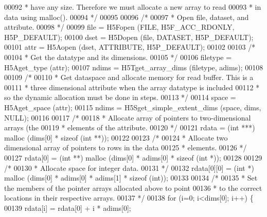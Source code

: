 \begin{DoxyCode}
00092 \textcolor{comment}{     * have any size.  Therefore we must allocate a new array to read}
00093 \textcolor{comment}{     * in data using malloc().}
00094 \textcolor{comment}{     */}
00095 
00096     \textcolor{comment}{/*}
00097 \textcolor{comment}{     * Open file, dataset, and attribute.}
00098 \textcolor{comment}{     */}
00099     file = H5Fopen (FILE, H5F\_ACC\_RDONLY, H5P\_DEFAULT);
00100     dset = H5Dopen (file, DATASET, H5P\_DEFAULT);
00101     attr = H5Aopen (dset, ATTRIBUTE, H5P\_DEFAULT);
00102 
00103     \textcolor{comment}{/*}
00104 \textcolor{comment}{     * Get the datatype and its dimensions.}
00105 \textcolor{comment}{     */}
00106     filetype = H5Aget\_type (attr);
00107     ndims = H5Tget\_array\_dims (filetype, adims);
00108 
00109     \textcolor{comment}{/*}
00110 \textcolor{comment}{     * Get dataspace and allocate memory for read buffer.  This is a}
00111 \textcolor{comment}{     * three dimensional attribute when the array datatype is included}
00112 \textcolor{comment}{     * so the dynamic allocation must be done in steps.}
00113 \textcolor{comment}{     */}
00114     space = H5Aget\_space (attr);
00115     ndims = H5Sget\_simple\_extent\_dims (space, dims, NULL);
00116 
00117     \textcolor{comment}{/*}
00118 \textcolor{comment}{     * Allocate array of pointers to two-dimensional arrays (the}
00119 \textcolor{comment}{     * elements of the attribute.}
00120 \textcolor{comment}{     */}
00121     rdata = (\textcolor{keywordtype}{int} ***) malloc (dims[0] * \textcolor{keyword}{sizeof} (\textcolor{keywordtype}{int} **));
00122 
00123     \textcolor{comment}{/*}
00124 \textcolor{comment}{     * Allocate two dimensional array of pointers to rows in the data}
00125 \textcolor{comment}{     * elements.}
00126 \textcolor{comment}{     */}
00127     rdata[0] = (\textcolor{keywordtype}{int} **) malloc (dims[0] * adims[0] * \textcolor{keyword}{sizeof} (\textcolor{keywordtype}{int} *));
00128 
00129     \textcolor{comment}{/*}
00130 \textcolor{comment}{     * Allocate space for integer data.}
00131 \textcolor{comment}{     */}
00132     rdata[0][0] = (\textcolor{keywordtype}{int} *) malloc (dims[0] * adims[0] * adims[1] * \textcolor{keyword}{sizeof} (\textcolor{keywordtype}{int}));
00133 
00134     \textcolor{comment}{/*}
00135 \textcolor{comment}{     * Set the members of the pointer arrays allocated above to point}
00136 \textcolor{comment}{     * to the correct locations in their respective arrays.}
00137 \textcolor{comment}{     */}
00138     \textcolor{keywordflow}{for} (i=0; i<dims[0]; i++) \{
00139         rdata[i] = rdata[0] + i * adims[0];

\end{DoxyCode}
